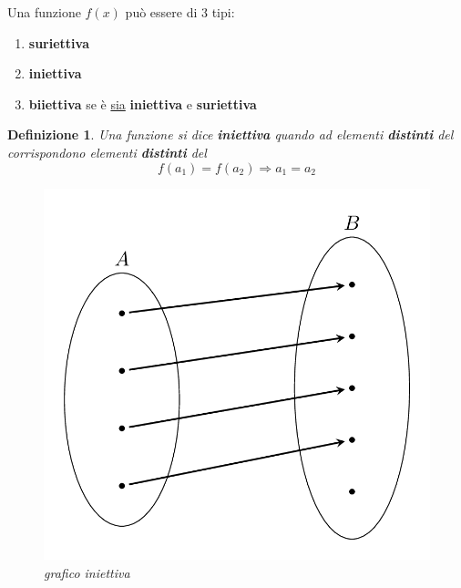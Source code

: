 \documentclass[12pt, a4paper]{article}
\theoremstyle{break}
\newtheorem{defn}{Definizione}
\theoremstyle{lemma}
\theoremstyle{lemma}
\theoremstyle{lemma}
\begin{document}
Una funzione $f(x)$ può essere di 3 tipi:
\begin{enumerate}
    \item \textbf{suriettiva}
    \item \textbf{iniettiva}
    \item \textbf{biiettiva} se è \underline{sia} \textbf{iniettiva} e  \textbf{suriettiva}
    \end{enumerate}

    \begin{defn} Una funzione si dice \textbf{iniettiva} quando ad elementi \textbf{distinti} del  corrispondono elementi \textbf{distinti} del 
\begin{equation}
  f(a_1) = f(a_2) \Rightarrow a_1 = a_2
\end{equation}

\begin{figure}[ht]
	\center
	\includegraphics[scale=0.135]{iniettiva}
	\caption{grafico iniettiva}
	\label{fig:grafico_iniettiva}
\end{figure}
\end{defn}
\noindent
\end{document}
